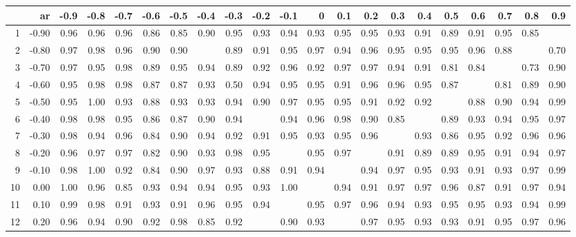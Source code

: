 \begin{table}[ht]
\centering
\begin{tabular}{rrrrrrrrrrrrrrrrrrrrr}
  \hline
 & ar & -0.9 & -0.8 & -0.7 & -0.6 & -0.5 & -0.4 & -0.3 & -0.2 & -0.1 & 0 & 0.1 & 0.2 & 0.3 & 0.4 & 0.5 & 0.6 & 0.7 & 0.8 & 0.9 \\ 
  \hline
1 & -0.90 & 0.96 & 0.96 & 0.96 & 0.86 & 0.85 & 0.90 & 0.95 & 0.93 & 0.94 & 0.93 & 0.95 & 0.95 & 0.93 & 0.91 & 0.89 & 0.91 & 0.95 & 0.85 &  \\ 
  2 & -0.80 & 0.97 & 0.98 & 0.96 & 0.90 & 0.90 &  & 0.89 & 0.91 & 0.95 & 0.97 & 0.94 & 0.96 & 0.95 & 0.95 & 0.95 & 0.96 & 0.88 &  & 0.70 \\ 
  3 & -0.70 & 0.97 & 0.95 & 0.98 & 0.89 & 0.95 & 0.94 & 0.89 & 0.92 & 0.96 & 0.92 & 0.97 & 0.97 & 0.94 & 0.91 & 0.81 & 0.84 &  & 0.73 & 0.90 \\ 
  4 & -0.60 & 0.95 & 0.98 & 0.98 & 0.87 & 0.87 & 0.93 & 0.50 & 0.94 & 0.95 & 0.95 & 0.91 & 0.96 & 0.96 & 0.95 & 0.87 &  & 0.81 & 0.89 & 0.90 \\ 
  5 & -0.50 & 0.95 & 1.00 & 0.93 & 0.88 & 0.93 & 0.93 & 0.94 & 0.90 & 0.97 & 0.95 & 0.95 & 0.91 & 0.92 & 0.92 &  & 0.88 & 0.90 & 0.94 & 0.99 \\ 
  6 & -0.40 & 0.98 & 0.98 & 0.95 & 0.86 & 0.87 & 0.90 & 0.94 &  & 0.94 & 0.96 & 0.98 & 0.90 & 0.85 &  & 0.89 & 0.93 & 0.94 & 0.95 & 0.97 \\ 
  7 & -0.30 & 0.98 & 0.94 & 0.96 & 0.84 & 0.90 & 0.94 & 0.92 & 0.91 & 0.95 & 0.93 & 0.95 & 0.96 &  & 0.93 & 0.86 & 0.95 & 0.92 & 0.96 & 0.96 \\ 
  8 & -0.20 & 0.96 & 0.97 & 0.97 & 0.82 & 0.90 & 0.93 & 0.98 & 0.95 &  & 0.95 & 0.97 &  & 0.91 & 0.89 & 0.89 & 0.95 & 0.91 & 0.94 & 0.97 \\ 
  9 & -0.10 & 0.98 & 1.00 & 0.92 & 0.84 & 0.90 & 0.97 & 0.93 & 0.88 & 0.91 & 0.94 &  & 0.94 & 0.97 & 0.95 & 0.93 & 0.91 & 0.93 & 0.97 & 0.99 \\ 
  10 & 0.00 & 1.00 & 0.96 & 0.85 & 0.93 & 0.94 & 0.94 & 0.95 & 0.93 & 1.00 &  & 0.94 & 0.91 & 0.97 & 0.97 & 0.96 & 0.87 & 0.91 & 0.97 & 0.94 \\ 
  11 & 0.10 & 0.99 & 0.98 & 0.91 & 0.93 & 0.91 & 0.96 & 0.95 & 0.94 &  & 0.95 & 0.97 & 0.96 & 0.94 & 0.93 & 0.95 & 0.95 & 0.93 & 0.94 & 0.99 \\ 
  12 & 0.20 & 0.96 & 0.94 & 0.90 & 0.92 & 0.98 & 0.85 & 0.92 &  & 0.90 & 0.93 &  & 0.97 & 0.95 & 0.93 & 0.93 & 0.91 & 0.95 & 0.97 & 0.96 \\ 

\end{tabular}
\end{table}
